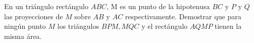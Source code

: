 En un triángulo rectángulo $ABC$, M es un punto de la hipotenusa $BC$ y $P$ y $Q$ las proyecciones de $M$ sobre $AB$ y $AC$ respectivamente. Demostrar que para ningún punto $M$ los triángulos $BPM, MQC$ y el rectángulo $AQMP$ tienen la misma área.
